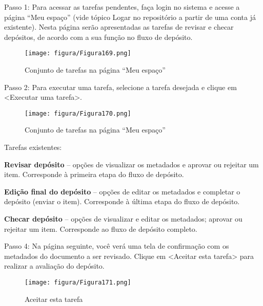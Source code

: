 \documentclass[12pt,hidelinks]{article}
\begin{document}
    Passo 1: Para acessar as tarefas pendentes, faça login no sistema e acesse a página “Meu espaço” (vide tópico Logar no repositório a partir de uma conta já existente). Nesta página serão apresentadas as tarefas de revisar e checar depósitos, de acordo com a sua função no fluxo de depósito.
    
    \begin{figure}[!htp]
                \centering
                \texttt{[image: figura/Figura169.png]}
                \caption{Conjunto de tarefas na página “Meu espaço”}
            \label{Rotulo}
        \end{figure}

\newpage

    Passo 2: Para executar uma tarefa, selecione a tarefa desejada e clique em <Executar uma tarefa>. 
    
    \begin{figure}[!htp]
                \centering
                \texttt{[image: figura/Figura170.png]}
                \caption{Conjunto de tarefas na página “Meu espaço”}
            \label{Rotulo}
        \end{figure}
    
    Tarefas existentes:
    
    \singlespacing
    
    \textbf{Revisar depósito} – opções de visualizar os metadados e aprovar ou rejeitar um item. Corresponde à primeira etapa do fluxo de depósito.
    
    \singlespacing
    
    \textbf{Edição final do depósito} – opções de editar os metadados e completar o depósito (enviar o item). Corresponde à última etapa do fluxo de depósito.
    
    \singlespacing
    
    \textbf{Checar depósito} – opções de visualizar e editar os metadados; aprovar ou rejeitar um item. Corresponde ao fluxo de depósito completo.
    
    \singlespacing
    
    Passo 4: Na página seguinte, você verá uma tela de confirmação com os metadados do documento a ser revisado. Clique em <Aceitar esta tarefa> para realizar a avaliação do depósito.
    
    \begin{figure}[!htp]
                \centering
                \texttt{[image: figura/Figura171.png]}
                \caption{Aceitar esta tarefa}
            \label{Rotulo}
        \end{figure}
    
\end{document}
